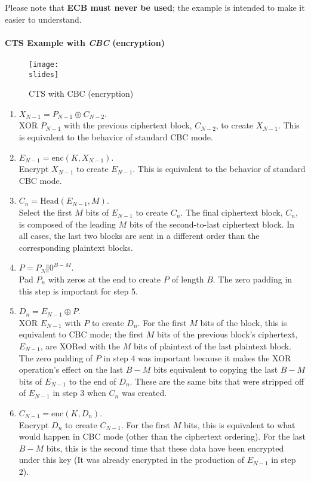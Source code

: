 Please note that \textbf{ECB must never be used}; the example is intended to make it easier to understand.

\paragraph*{CTS Example with \textit{CBC} (encryption)}
\begin{figure}[H]
    \centering
    \texttt{[image: \\slides]}
    \caption{CTS with CBC (encryption)}
\end{figure}
\begin{enumerate}
    \item $X_{N-1} = P_{N-1} \oplus C_{N-2}$. \\
          XOR $P_{N-1}$ with the previous ciphertext block, $C_{N-2}$, to create $X_{N-1}$. This is equivalent to the behavior of standard CBC mode.
    \item $E_{N-1} = \text{enc}(K, X_{N-1})$.\\
          Encrypt $X_{N-1}$ to create $E_{N-1}$. This is equivalent to the behavior of standard CBC mode.
    \item $C_n = \text{Head}(E_{N-1}, M)$.\\
          Select the first $M$ bits of $E_{N-1}$ to create $C_n$. The final ciphertext block, $C_n$, is composed of the leading $M$ bits of the second-to-last ciphertext block. In all cases, the last two blocks are sent in a different order than the corresponding plaintext blocks.
    \item $P = P_{N} \Vert 0^{B-M}$.\\
          Pad $P_n$ with zeros at the end to create $P$ of length $B$. The zero padding in this step is important for step 5.
    \item $D_n = E_{N-1} \oplus P$.\\
          XOR $E_{N-1}$ with $P$ to create $D_n$. For the first $M$ bits of the block, this is equivalent to CBC mode; the first $M$ bits of the previous block's ciphertext, $E_{N-1}$, are XORed with the $M$ bits of plaintext of the last plaintext block. The zero padding of $P$ in step 4 was important because it makes the XOR operation's effect on the last $B-M$ bits equivalent to copying the last $B-M$ bits of $E_{N-1}$ to the end of $D_n$. These are the same bits that were stripped off of $E_{N-1}$ in step 3 when $C_n$ was created.
    \item $C_{N-1} = \text{enc}(K, D_n)$.\\
          Encrypt $D_n$ to create $C_{N-1}$. For the first $M$ bits, this is equivalent to what would happen in CBC mode (other than the ciphertext ordering). For the last $B-M$ bits, this is the second time that these data have been encrypted under this key (It was already encrypted in the production of $E_{N-1}$ in step 2).
\end{enumerate}




